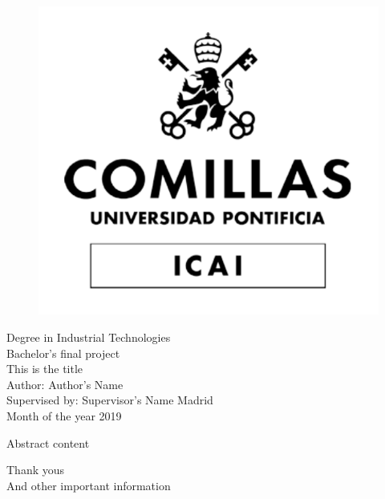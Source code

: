\documentclass[12pt, a4paper, twoside]{book} %
\newenvironment{abstract}%
{\cleardoublepage \null \vfill \begin{center}%
		\bfseries \abstractname \end{center}}%
{\vfill\null}
\begin{document}
	
	\frontmatter
	\pagestyle{empty} %
	
	\begin{titlepage}
		\begin{figure}
			\centering
			\includegraphics[width=0.3\linewidth]{LogoUniversidadBN}
		\end{figure}
		\centering
		\Large Degree in Industrial Technologies \\ %
		\vspace*{2.5em}
		\centering
		Bachelor's final project \\ %
		\vspace*{1em}
		This is the title %
		\\ \normalsize
		\vspace*{3em}
		Author:  Author's Name \\ %
		Supervised by: Supervisor's Name %
		\vfill
		Madrid \\
		Month of the year 2019 %
	\end{titlepage}
	
	\begin{abstract}
		Abstract content
	\end{abstract}

	\clearpage\mbox{}\clearpage %

	{\centering Thank yous\\}
	\vfill
	And other important information
\end{document}
